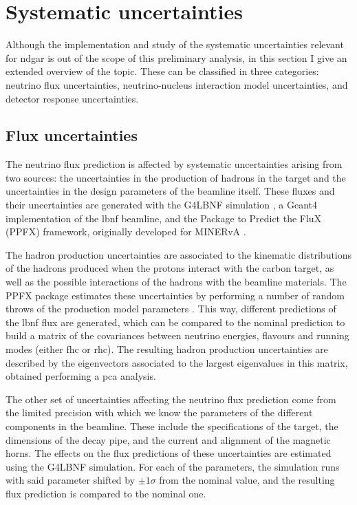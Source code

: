 \section{Systematic uncertainties}
\label{sec:gar_systematics}

Although the implementation and study of the systematic uncertainties relevant for \gls{ndgar} is out of the scope of this preliminary analysis, in this section I give an extended overview of the topic. These can be classified in three categories: neutrino flux uncertainties, neutrino-nucleus interaction model uncertainties, and detector response uncertainties.

\subsection{Flux uncertainties}

The neutrino flux prediction is affected by systematic uncertainties arising from two sources: the uncertainties in the production of hadrons in the target and the uncertainties in the design parameters of the beamline itself. These fluxes and their uncertainties are generated with the G4LBNF simulation \cite{DUNE2020TDR2}, a Geant4 implementation of the \gls{lbnf} beamline, and the Package to Predict the FluX (PPFX) framework, originally developed for MINERvA \cite{Golan2016}.

The hadron production uncertainties are associated to the kinematic distributions of the hadrons produced when the protons interact with the carbon target, as well as the possible interactions of the hadrons with the beamline materials. The PPFX package estimates these uncertainties by performing a number of random throws of the production model parameters \cite{Bashyal2017}. This way, different predictions of the \gls{lbnf} flux are generated, which can be compared to the nominal prediction to build a matrix of the covariances between neutrino energies, flavours and running modes (either \gls{fhc} or \gls{rhc}). The resulting hadron production uncertainties are described by the eigenvectors associated to the largest eigenvalues in this matrix, obtained performing a \gls{pca} analysis.

The other set of uncertainties affecting the neutrino flux prediction come from the limited precision with which we know the parameters of the different components in the beamline. These include the specifications of the target, the dimensions of the decay pipe, and the current and alignment of the magnetic horns. The effects on the flux predictions of these uncertainties are estimated using the G4LBNF simulation. For each of the parameters, the simulation runs with said parameter shifted by $\pm 1\sigma$ from the nominal value, and the resulting flux prediction is compared to the nominal one.

